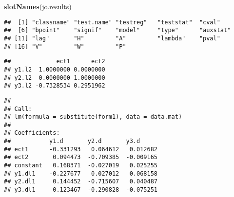 \documentclass[]{book}
\newenvironment{Shaded}{\begin{snugshade}}{\end{snugshade}}
\newcommand{\KeywordTok}[1]{\textcolor[rgb]{0.13,0.29,0.53}{\textbf{#1}}}
\newcommand{\OperatorTok}[1]{\textcolor[rgb]{0.81,0.36,0.00}{\textbf{#1}}}
\newcommand{\NormalTok}[1]{#1}
\theoremstyle{definition}
\theoremstyle{definition}
\theoremstyle{definition}
\theoremstyle{remark}
\begin{document}
\begin{Shaded}
\begin{Highlighting}[]
\KeywordTok{slotNames}\NormalTok{(jo.results)}
\end{Highlighting}
\end{Shaded}

\begin{verbatim}
##  [1] "classname" "test.name" "testreg"   "teststat"  "cval"     
##  [6] "bpoint"    "signif"    "model"     "type"      "auxstat"  
## [11] "lag"       "H"         "A"         "lambda"    "pval"     
## [16] "V"         "W"         "P"
\end{verbatim}

\begin{Shaded}
\end{Shaded}

\begin{verbatim}
##             ect1      ect2
## y1.l2  1.0000000 0.0000000
## y2.l2  0.0000000 1.0000000
## y3.l2 -0.7328534 0.2951962
\end{verbatim}

\begin{Shaded}
\end{Shaded}

\begin{verbatim}
## 
## Call:
## lm(formula = substitute(form1), data = data.mat)
## 
## Coefficients:
##           y1.d       y2.d       y3.d     
## ect1      -0.331293   0.064612   0.012682
## ect2       0.094473  -0.709385  -0.009165
## constant   0.168371  -0.027019   0.025255
## y1.dl1    -0.227677   0.027012   0.068158
## y2.dl1     0.144452  -0.715607   0.040487
## y3.dl1     0.123467  -0.290828  -0.075251
\end{verbatim}

\begin{Shaded}
\end{Shaded}
\end{document}
